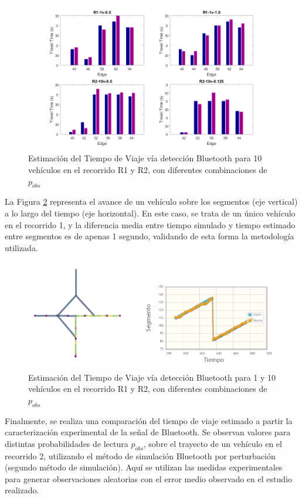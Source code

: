 \begin{figure}[!htp]
	\centering
	\includegraphics[width=0.9\linewidth]{images/edge-tt-bt.png}
	\captionsetup{width=0.8\linewidth}
	\caption{Estimación del Tiempo de Viaje vía detección Bluetooth para 10 vehículos en el recorrido R1 y R2, con diferentes combinaciones de $p_{obs}$}
    \label{fig:edge-tt-bt}
\end{figure}


La Figura \ref{fig:time-segment} representa el avance de un vehículo sobre los segmentos (eje vertical) a lo largo del tiempo (eje horizontal). En este caso, se trata de un único vehículo en el recorrido 1, y la diferencia media entre tiempo simulado y tiempo estimado entre segmentos es de apenas 1 segundo, validando de esta forma la metodología utilizada.

\begin{figure}[!htp]
	\centering
	\includegraphics[width=0.7\linewidth]{images/time-segment.png}
	\captionsetup{width=0.8\linewidth}
	\caption{Estimación del Tiempo de Viaje vía detección Bluetooth para 1 y 10 vehículos en el recorrido R1 y R2, con diferentes combinaciones de $p_{obs}$}
    \label{fig:time-segment}
\end{figure}

Finalmente, se realiza una comparación del tiempo de viaje estimado a partir la caracterización experimental de la señal de Bluetooth. Se observan valores para distintas probabilidades de lectura $p_{obs}$, sobre el trayecto de un vehículo en el recorrido 2, utilizando el método de simulación Bluetooth por perturbación (segundo método de simulación). Aquí se utilizan las medidas experimentales para generar observaciones aleatorias con el error medio observado en el estudio realizado.

